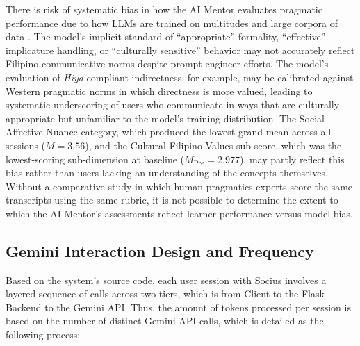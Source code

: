 There is risk of systematic bias in how the AI Mentor evaluates 
pragmatic performance due to how LLMs are trained on multitudes and large corpora of data \cite{bender_dangers_2021}. The model's implicit standard of ``appropriate'' 
formality, ``effective'' implicature handling, or ``culturally sensitive'' 
behavior may not accurately reflect Filipino communicative norms despite prompt-engineer efforts. The model's 
evaluation of \textit{Hiya}-compliant indirectness, for example, may be 
calibrated against Western pragmatic norms in which directness is more 
valued, leading to systematic underscoring of users who communicate in ways 
that are culturally appropriate but unfamiliar to the model's training 
distribution. The Social Affective Nuance category, which produced the 
lowest grand mean across all sessions ($M = 3.56$), and the Cultural 
Filipino Values sub-score, which was the lowest-scoring sub-dimension at 
baseline ($M_{\text{Pre}} = 2.977$), may partly reflect this bias rather 
than users lacking an understanding of the concepts themselves. Without a 
comparative study in which human pragmatics experts score the same 
transcripts using the same rubric, it is not possible to determine the 
extent to which the AI Mentor's assessments reflect learner performance 
versus model bias.


\subsection{Gemini Interaction Design and Frequency}


Based on the system's source code, each user session with Socius involves a layered sequence of calls across two tiers, which is from Client
to the Flask Backend to the Gemini API. Thus, the amount of tokens processed per session is based on the number of distinct Gemini API calls, which is detailed as the following process:

